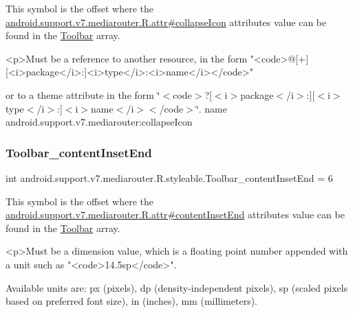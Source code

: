 This symbol is the offset where the \hyperlink{classandroid_1_1support_1_1v7_1_1mediarouter_1_1R_1_1attr_a7da4c775773862525355b5217dba4a78}{android.\+support.\+v7.\+mediarouter.\+R.\+attr\#collapse\+Icon} attribute\textquotesingle{}s value can be found in the \hyperlink{classandroid_1_1support_1_1v7_1_1mediarouter_1_1R_1_1styleable_a6815cdfaadde30c82b955863af196899}{Toolbar} array.

\begin{DoxyVerb}      <p>Must be a reference to another resource, in the form "<code>@[+][<i>package</i>:]<i>type</i>:<i>name</i></code>"
\end{DoxyVerb}
 or to a theme attribute in the form \char`\"{}$<$code$>$?\mbox{[}$<$i$>$package$<$/i$>$\+:\mbox{]}\mbox{[}$<$i$>$type$<$/i$>$\+:\mbox{]}$<$i$>$name$<$/i$>$$<$/code$>$\char`\"{}.  name android.\+support.\+v7.\+mediarouter\+:collapse\+Icon \mbox{\label{classandroid_1_1support_1_1v7_1_1mediarouter_1_1R_1_1styleable_a8f713fe1fbe5422e426d843e644451f3}} 
\subsubsection{\texorpdfstring{Toolbar\+\_\+content\+Inset\+End}{Toolbar\_contentInsetEnd}}
{\footnotesize\ttfamily int android.\+support.\+v7.\+mediarouter.\+R.\+styleable.\+Toolbar\+\_\+content\+Inset\+End = 6\hspace{0.3cm}{\ttfamily [static]}}

This symbol is the offset where the \hyperlink{classandroid_1_1support_1_1v7_1_1mediarouter_1_1R_1_1attr_a1e18403cb2eb932c1f1398fb56b2b848}{android.\+support.\+v7.\+mediarouter.\+R.\+attr\#content\+Inset\+End} attribute\textquotesingle{}s value can be found in the \hyperlink{classandroid_1_1support_1_1v7_1_1mediarouter_1_1R_1_1styleable_a6815cdfaadde30c82b955863af196899}{Toolbar} array.

\begin{DoxyVerb}      <p>Must be a dimension value, which is a floating point number appended with a unit such as "<code>14.5sp</code>".
\end{DoxyVerb}
 Available units are\+: px (pixels), dp (density-\/independent pixels), sp (scaled pixels based on preferred font size), in (inches), mm (millimeters). 

